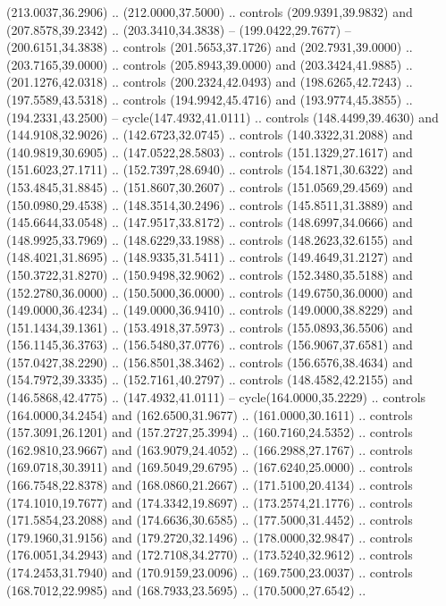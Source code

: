   (213.0037,36.2906) .. (212.0000,37.5000) .. controls (209.9391,39.9832) and
  (207.8578,39.2342) .. (203.3410,34.3838) -- (199.0422,29.7677) --
  (200.6151,34.3838) .. controls (201.5653,37.1726) and (202.7931,39.0000) ..
  (203.7165,39.0000) .. controls (205.8943,39.0000) and (203.3424,41.9885) ..
  (201.1276,42.0318) .. controls (200.2324,42.0493) and (198.6265,42.7243) ..
  (197.5589,43.5318) .. controls (194.9942,45.4716) and (193.9774,45.3855) ..
  (194.2331,43.2500) -- cycle(147.4932,41.0111) .. controls (148.4499,39.4630)
  and (144.9108,32.9026) .. (142.6723,32.0745) .. controls (140.3322,31.2088)
  and (140.9819,30.6905) .. (147.0522,28.5803) .. controls (151.1329,27.1617)
  and (151.6023,27.1711) .. (152.7397,28.6940) .. controls (154.1871,30.6322)
  and (153.4845,31.8845) .. (151.8607,30.2607) .. controls (151.0569,29.4569)
  and (150.0980,29.4538) .. (148.3514,30.2496) .. controls (145.8511,31.3889)
  and (145.6644,33.0548) .. (147.9517,33.8172) .. controls (148.6997,34.0666)
  and (148.9925,33.7969) .. (148.6229,33.1988) .. controls (148.2623,32.6155)
  and (148.4021,31.8695) .. (148.9335,31.5411) .. controls (149.4649,31.2127)
  and (150.3722,31.8270) .. (150.9498,32.9062) .. controls (152.3480,35.5188)
  and (152.2780,36.0000) .. (150.5000,36.0000) .. controls (149.6750,36.0000)
  and (149.0000,36.4234) .. (149.0000,36.9410) .. controls (149.0000,38.8229)
  and (151.1434,39.1361) .. (153.4918,37.5973) .. controls (155.0893,36.5506)
  and (156.1145,36.3763) .. (156.5480,37.0776) .. controls (156.9067,37.6581)
  and (157.0427,38.2290) .. (156.8501,38.3462) .. controls (156.6576,38.4634)
  and (154.7972,39.3335) .. (152.7161,40.2797) .. controls (148.4582,42.2155)
  and (146.5868,42.4775) .. (147.4932,41.0111) -- cycle(164.0000,35.2229) ..
  controls (164.0000,34.2454) and (162.6500,31.9677) .. (161.0000,30.1611) ..
  controls (157.3091,26.1201) and (157.2727,25.3994) .. (160.7160,24.5352) ..
  controls (162.9810,23.9667) and (163.9079,24.4052) .. (166.2988,27.1767) ..
  controls (169.0718,30.3911) and (169.5049,29.6795) .. (167.6240,25.0000) ..
  controls (166.7548,22.8378) and (168.0860,21.2667) .. (171.5100,20.4134) ..
  controls (174.1010,19.7677) and (174.3342,19.8697) .. (173.2574,21.1776) ..
  controls (171.5854,23.2088) and (174.6636,30.6585) .. (177.5000,31.4452) ..
  controls (179.1960,31.9156) and (179.2720,32.1496) .. (178.0000,32.9847) ..
  controls (176.0051,34.2943) and (172.7108,34.2770) .. (173.5240,32.9612) ..
  controls (174.2453,31.7940) and (170.9159,23.0096) .. (169.7500,23.0037) ..
  controls (168.7012,22.9985) and (168.7933,23.5695) .. (170.5000,27.6542) ..
